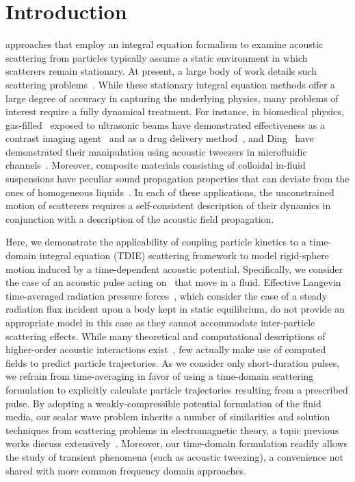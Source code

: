 \section{Introduction}

 approaches that employ an integral equation formalism to examine acoustic scattering from particles typically assume a static environment in which scatterers remain stationary.
At present, a large body of work details such scattering problems~\cite{Waterman1969, Ding1989, Ye1997}.
While these stationary integral equation methods offer a large degree of accuracy in capturing the underlying physics, many problems of interest require a fully dynamical treatment.
For instance, in biomedical physics, gas-filled \bubbles\ exposed to ultrasonic beams have demonstrated effectiveness as a contrast imaging agent~\cite{Blomley2001} and as a drug delivery method~\cite{Allen2002,Hernot2008}, and Ding \etal\ have demonstrated their manipulation using acoustic tweezers in microfluidic channels~\cite{Ding2012}.
Moreover, composite materials consisting of colloidal in-fluid suspensions have peculiar sound propagation properties that can deviate from the ones of homogeneous liquids~\cite{Ye1993}.
In each of these applications, the unconstrained motion of scatterers requires a self-consistent description of their dynamics in conjunction with a description of the acoustic field propagation.

Here, we demonstrate the applicability of coupling particle kinetics to a time-domain integral equation (TDIE) scattering framework to model rigid-sphere motion induced by a time-dependent acoustic potential.
Specifically, we consider the case of an acoustic pulse acting on \bubbles\ that move in a fluid.
Effective Langevin time-averaged radiation pressure forces~\cite{King1934, Borgnis1953}, which consider the case of a steady radiation flux incident upon a body kept in static equilibrium, do not provide an appropriate model in this case as they cannot accommodate inter-particle scattering effects.
While many theoretical and computational descriptions of higher-order acoustic interactions exist~\cite{Gumerov2002, Doinikov2004, Doinikov2005, Ilinskii2007, Azizoglu2009}, few actually make use of computed fields to predict particle trajectories.
As we consider only short-duration pulses, we refrain from time-averaging in favor of using a time-domain scattering formulation to explicitly calculate particle trajectories resulting from a prescribed pulse.
By adopting a weakly-compressible potential formulation of the fluid media, our scalar wave problem inherits a number of similarities and solution techniques from scattering problems in electromagnetic theory, a topic previous works discuss extensively~\cite{Tsang1998,Gumerov2002,Li2014}.
Moreover, our time-domain formulation readily allows the study of transient phenomena (such as acoustic tweezing), a convenience not shared with more common frequency domain approaches.

